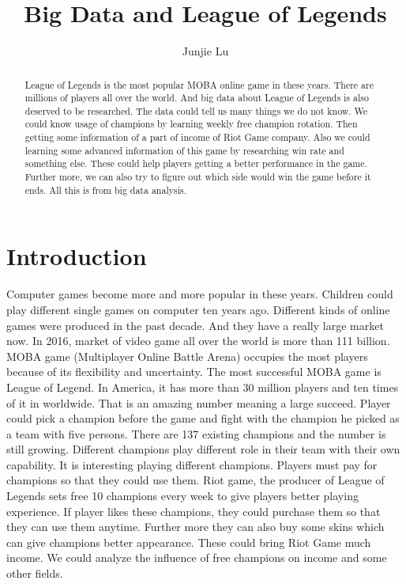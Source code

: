 \documentclass[sigconf]{acmart}
\begin{document}
\title{Big Data and League of Legends}


\author{Junjie Lu}




\begin{abstract}
League of Legends is the most popular MOBA online game in these years. There are millions of players all over the world. And big data about League of Legends is also deserved to be researched. The data could tell us many things we do not know. We could know usage of champions by learning weekly free champion rotation. Then getting some information of a part of income of Riot Game company. Also we could learning some advanced information of this game by researching win rate and something else. These could help players getting a better performance in the game. Further more, we can also try to figure out which side would win the game before it ends. All this is from big data analysis. 
\end{abstract}



\maketitle



\section{Introduction}
Computer games become more and more popular in these years. Children could play different single games on computer ten years ago. Different kinds of online games were produced in the past decade. And they have a really large market now. In 2016, market of video game all over the world is more than 111 billion.\cite{bbb} MOBA game (Multiplayer Online Battle Arena) occupies the most players because of its flexibility and uncertainty. The most successful MOBA game is League of Legend. In America, it has more than 30 million players and ten times of it in worldwide. That is an amazing number meaning a large succeed. Player could pick a champion before the game and fight with the champion he picked as a team with five persons. There are 137 existing champions and the number is still growing. Different champions play different role in their team with their own capability. It is interesting playing different champions. Players must pay for champions so that they could use them. Riot game, the producer of League of Legends sets free 10 champions every week to give players better playing experience. If player likes these champions, they could purchase them so that they can use them anytime. Further more they can also buy some skins which can give champions better appearance. These could bring Riot Game much income. We could analyze the influence of free champions on income and some other fields.
\end{document}
